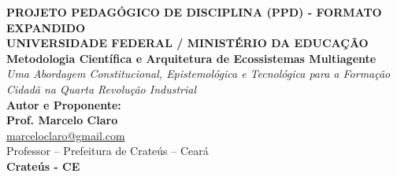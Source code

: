 \documentclass[12pt,a4paper]{article}
\begin{document}
\begin{titlepage}
    \begin{center}
        \vspace*{2cm}
        \Large{\textbf{PROJETO PEDAGÓGICO DE DISCIPLINA (PPD) - FORMATO EXPANDIDO}}\\
        \vspace{1cm}
        \Large{\textbf{UNIVERSIDADE FEDERAL / MINISTÉRIO DA EDUCAÇÃO}}\\
        
        \vspace{3cm}
        \Huge{\textbf{Metodologia Científica e Arquitetura de Ecossistemas Multiagente}}\\
        \vspace{1cm}
        \Large{\textit{Uma Abordagem Constitucional, Epistemológica e Tecnológica para a Formação Cidadã na Quarta Revolução Industrial}}\\
        
        \vspace{4cm}
        \textbf{Autor e Proponente:}\\
        \textbf{Prof. Marcelo Claro}\\
        \href{mailto:marceloclaro@gmail.com}{marceloclaro@gmail.com}\\
        Professor -- Prefeitura de Crateús -- Ceará\\
        
        \vfill
        \textbf{Crateús - CE}\\
        \textbf{\the\year}
    \end{center}
\end{titlepage}
\end{document}
